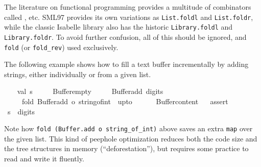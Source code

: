 \begin{isabellebody}
\begin{isamarkuptext}
  \begin{warn}
  The literature on functional programming provides a multitude of
  combinators called ,  etc.  SML97
  provides its own variations as \verb|List.foldl| and \verb|List.foldr|, while the classic Isabelle library also has the
  historic \verb|Library.foldl| and \verb|Library.foldr|.  To avoid
  further confusion, all of this should be ignored, and \verb|fold| (or
  \verb|fold_rev|) used exclusively.
  \end{warn}%
\end{isamarkuptext}%
\isamarkuptrue%
%
\endisatagmlref
{\isafoldmlref}%
%
\isadelimmlref
%
\endisadelimmlref
%
\isadelimmlex
%
\endisadelimmlex
%
\isatagmlex
%
\begin{isamarkuptext}%
The following example shows how to fill a text buffer
  incrementally by adding strings, either individually or from a given
  list.%
\end{isamarkuptext}%
\isamarkuptrue%
%
\endisatagmlex
{\isafoldmlex}%
%
\isadelimmlex
%
\endisadelimmlex
%
\isadelimML
%
\endisadelimML
%
\isatagML
{}\isamarkupfalse%
\ {}\isanewline
\ \ val\ s\ {}\isanewline
\ \ \ \ Buffer{}empty\isanewline
\ \ \ \ {}{}\ Buffer{}add\ {}digits{}\ {}\isanewline
\ \ \ \ {}{}\ fold\ {}Buffer{}add\ o\ string{}of{}int{}\ {}{}\ upto\ {}{}\isanewline
\ \ \ \ {}{}\ Buffer{}content{}\isanewline
\isanewline
\ \ %
\isaantiq
assert{}%
\endisaantiq
\ {}s\ {}\ {}digits{}\ {}{}{}{}{}{}{}{}{}{}{}{}{}\isanewline
{}%
\endisatagML
{\isafoldML}%
%
\isadelimML
%
\endisadelimML
%
\begin{isamarkuptext}%
Note how \verb|fold (Buffer.add o string_of_int)| above saves
  an extra \verb|map| over the given list.  This kind of peephole
  optimization reduces both the code size and the tree structures in
  memory (``deforestation''), but requires some practice to read and
  write it fluently.


\end{isamarkuptext}
\end{isabellebody}
